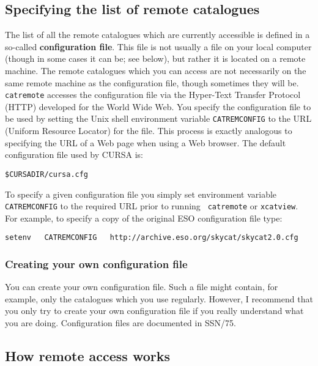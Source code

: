\documentclass[twoside,11pt]{article}
\newcommand{\xref}[3]{#1}
\renewcommand{\_}{\texttt{\symbol{95}}}
\begin{document}
\subsection{Specifying the list of remote catalogues  \label{REMCATS} }

The list of all the remote catalogues which are currently accessible
is defined in a so-called {\bf configuration file}.  This file is not
usually a file on your local computer (though in some cases it can be;
see below), but rather it is located on a remote machine.  The remote
catalogues which you can access are not necessarily on the same remote
machine as the configuration file, though sometimes they will be.  {\tt
catremote} accesses the configuration file via the Hyper-Text Transfer
Protocol (HTTP)  developed for the World Wide Web.  You specify the
configuration file to be used by setting the Unix shell environment
variable {\tt CATREM\_CONFIG} to the URL (Uniform Resource Locator)
for the file.  This process is exactly analogous to specifying the URL
of a Web page when using a Web browser.  The default configuration file
used by CURSA is:

\begin{center}
{\tt \$CURSA\_DIR/cursa.cfg}
\end{center}

To specify a given configuration file you simply set environment
variable {\tt CATREM\_CONFIG} to the required URL prior to running {\tt
catremote} or {\tt xcatview}.  For example, to specify a copy of the
original ESO configuration file type:

\begin{center}
{\tt setenv ~ CATREM\_CONFIG ~ http://archive.eso.org/skycat/skycat2.0.cfg}
\end{center}

\subsubsection{Creating your own configuration file}

You can create your own configuration file.  Such a file might contain,
for example, only the catalogues which you use regularly.  However, I
recommend that you only try to create your own configuration file if you
really understand what you are doing.  Configuration files are documented
in \xref{SSN/75}{ssn75}{}\cite{SSN75}.

\subsection{How remote access works  \label{REMWORK} }
\end{document}
